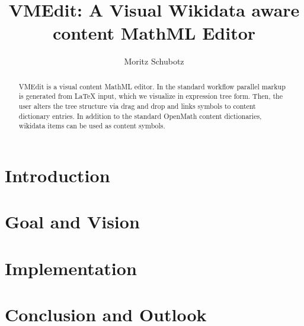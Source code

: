 \documentclass{llncs}
\begin{document}
\title{VMEdit: A Visual Wikidata aware content MathML Editor}

\author{
   Moritz Schubotz
}


\maketitle

\begin{abstract}
VMEdit is a visual content MathML editor.
In the standard workflow parallel markup is generated from LaTeX input, which we visualize in expression tree form.
Then, the user alters the tree structure via drag and drop and links symbols to content dictionary entries.
In addition to the standard OpenMath content dictionaries, wikidata items can be used as content symbols.
\end{abstract}

\section{Introduction}
\section{Goal and Vision}
\section{Implementation}
\section{Conclusion and Outlook}
\printbibliography
\end{document}
